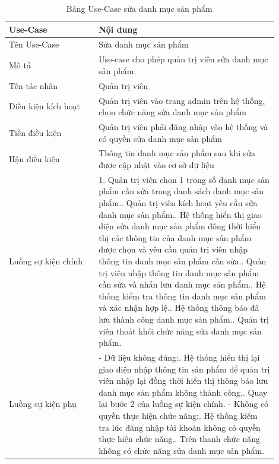 \begin{longtable}[htp]{ |m{0.3\linewidth}|m{0.6\linewidth}|}
 \caption{Bảng Use-Case sửa danh mục sản phẩm \label{long}}\\
 \hline
 Use-Case & Nội dung \\
 \hline
 Tên Use-Case & Sửa danh mục sản phẩm \\
 \hline
 Mô tả & Use-case cho phép quản trị viên sửa danh mục sản phẩm.\\
 \hline
 Tên tác nhân & Quản trị viên\\
 \hline
 Điều kiện kích hoạt & Quản trị viên vào trang admin trên hệ thống, chọn chức năng sửa danh mục sản phẩm\\
 \hline
 Tiền điều kiện & Quản trị viên phải đăng nhập vào hệ thống và có quyền sửa danh mục sản phẩm\\
 \hline
 Hậu điều kiện & Thông tin danh mục sản phẩm sau khi sửa được cập nhật vào cơ sở dữ liệu\\
 \hline
 Luồng sự kiện chính & 
 1. Quản trị viên chọn 1 trong số danh mục sản phẩm cần sửa trong danh sách danh mục sản phẩm.\newline
 2. Quản trị viên kích hoạt yêu cầu sửa danh mục sản phẩm.\newline
 3. Hệ thống hiển thị giao diện sửa danh mục sản phẩm đồng thời hiển thị các thông tin của danh mục sản phẩm được chọn và yêu cầu quản trị viên nhập thông tin danh mục sản phẩm cần sửa.\newline
 4. Quản trị viên nhập thông tin danh mục sản phẩm cần sửa và nhấn lưu danh mục sản phẩm.\newline
 5. Hệ thống kiểm tra thông tin danh mục sản phẩm và xác nhận hợp lệ.\newline
 6. Hệ thống thông báo đã lưu thành công danh mục sản phẩm.\newline	
 7. Quản trị viên thoát khỏi chức năng sửa danh mục sản phẩm.
 \\
 \hline
 Luồng sự kiện phụ & 
 - Dữ liệu không đúng:\newline
  1. Hệ thống hiển thị lại giao diện nhập thông tin sản phẩm để quản trị viên nhập lại đồng thời hiển thị thông báo lưu danh mục sản phẩm không thành công.\newline
  2. Quay lại bước 2 của luồng sự kiện chính.\newline
  - Không có quyền thực hiện chức năng:\newline
  1. Hệ thống kiểm tra lúc đăng nhập tài khoản không có quyền thực hiện chức năng.\newline
  2. Trên thanh chức năng không có chức năng sửa danh mục sản phẩm.
 \\
 \hline
\end{longtable}
